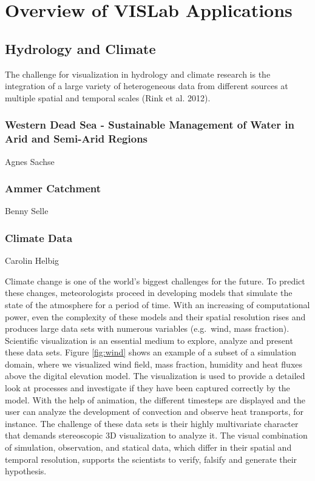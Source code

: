 \section{Overview of VISLab Applications}
\label{overview-of-VISLab-applications}

\subsection{Hydrology and Climate}
\label{hydrology-and-climate}

The challenge for visualization in hydrology and climate research is the integration of a large variety of heterogeneous data from different sources at multiple spatial and temporal scales (Rink et al. 2012).

\subsubsection{Western Dead Sea - Sustainable Management of Water in Arid and Semi-Arid
Regions}
\label{western-dead-sea---sustainable-management-of-water-in-arid-and-semi-arid-regions}

Agnes Sachse \cite{graebe:modelcare}

\subsubsection{Ammer Catchment}
\label{ammer-catchment}

Benny Selle

\subsubsection{Climate Data}
\label{climate-data}

Carolin Helbig

Climate change is one of the world's biggest challenges for the future. To predict these changes, meteorologists proceed in developing models that simulate the state of the atmosphere for a period of time. With an increasing of computational power, even the complexity of these models and their spatial resolution rises and produces large data sets with numerous variables (e.g.~wind, mass fraction). Scientific visualization is an essential medium to explore, analyze and present these data sets. Figure \ref{fig:wind} shows an example of a subset of a simulation domain, where we visualized wind field, mass fraction, humidity and heat fluxes above the digital elevation model. The visualization is used to provide a detailed look at processes and investigate if they have been captured correctly by the model. With the help of animation, the different timesteps are displayed and the user can analyze the development of convection and observe heat transports, for instance. The challenge of these data sets is their highly multivariate character that demands stereoscopic 3D visualization to analyze it. The visual combination of simulation, observation, and statical data, which differ in their spatial and temporal resolution, supports the scientists to verify, falsify and generate their hypothesis. \cite{helbig:eesenvirvis}

